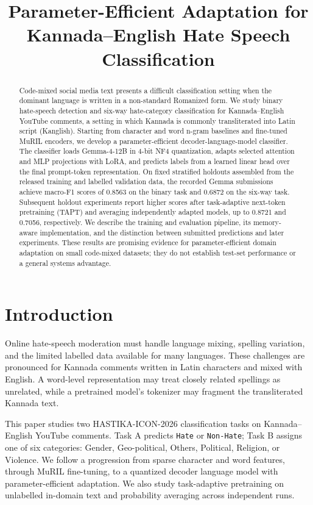 \documentclass[10pt]{article}
\title{Parameter-Efficient Adaptation for Kannada--English Hate Speech Classification}
\author{\todo{Author names and affiliations}}
\date{}
\newcommand{\taska}{Task A}
\newcommand{\taskb}{Task B}
\begin{document}
\maketitle

\begin{abstract}
Code-mixed social media text presents a difficult classification setting when
the dominant language is written in a non-standard Romanized form. We study
binary hate-speech detection and six-way hate-category classification for
Kannada--English YouTube comments, a setting in which Kannada is commonly
transliterated into Latin script (Kanglish). Starting from character and word
n-gram baselines and fine-tuned MuRIL encoders, we develop a parameter-efficient
decoder-language-model classifier. The classifier loads Gemma-4-12B in 4-bit
NF4 quantization, adapts selected attention and MLP projections with LoRA, and
predicts labels from a learned linear head over the final prompt-token
representation. On fixed stratified holdouts assembled from the released
training and labelled validation data, the recorded Gemma submissions achieve
macro-F1 scores of 0.8563 on the binary task and 0.6872 on the six-way task.
Subsequent holdout experiments report higher scores after task-adaptive
next-token pretraining (TAPT) and averaging independently adapted models, up to
0.8721 and 0.7056, respectively. We describe the training and evaluation
pipeline, its memory-aware implementation, and the distinction between
submitted predictions and later experiments. These results are promising
evidence for parameter-efficient domain adaptation on small code-mixed datasets;
they do not establish test-set performance or a general systems advantage.
\end{abstract}

\section{Introduction}
Online hate-speech moderation must handle language mixing, spelling variation,
and the limited labelled data available for many languages. These challenges
are pronounced for Kannada comments written in Latin characters and mixed with
English. A word-level representation may treat closely related spellings as
unrelated, while a pretrained model's tokenizer may fragment the transliterated
Kannada text.

This paper studies two HASTIKA-ICON-2026 classification tasks on Kannada--English
YouTube comments. \taska{} predicts \texttt{Hate} or \texttt{Non-Hate}; \taskb{}
assigns one of six categories: Gender, Geo-political, Others, Political,
Religion, or Violence. We follow a progression from sparse character and word
features, through MuRIL fine-tuning, to a quantized decoder language model with
parameter-efficient adaptation. We also study task-adaptive pretraining on
unlabelled in-domain text and probability averaging across independent runs.
\end{document}
